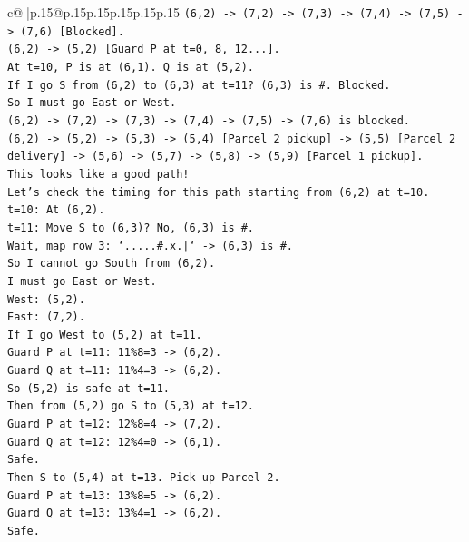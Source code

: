 \documentclass{article}
\begin{document}
{\begin{supertabular}{c@{$\;$}|p{.15\linewidth}@{}p{.15\linewidth}p{.15\linewidth}p{.15\linewidth}p{.15\linewidth}p{.15\linewidth}}
{{{\texttt{(6,2) {-}> (7,2) {-}> (7,3) {-}> (7,4) {-}> (7,5) {-}> (7,6) {[}Blocked{]}.} \\
\texttt{(6,2) {-}> (5,2) {[}Guard P at t=0, 8, 12...{]}.} \\
\texttt{At t=10, P is at (6,1). Q is at (5,2).} \\
\texttt{If I go S from (6,2) to (6,3) at t=11? (6,3) is \#. Blocked.} \\
\texttt{So I must go East or West.} \\
\texttt{(6,2) {-}> (7,2) {-}> (7,3) {-}> (7,4) {-}> (7,5) {-}> (7,6) is blocked.} \\
\texttt{(6,2) {-}> (5,2) {-}> (5,3) {-}> (5,4) {[}Parcel 2 pickup{]} {-}> (5,5) {[}Parcel 2 delivery{]} {-}> (5,6) {-}> (5,7) {-}> (5,8) {-}> (5,9) {[}Parcel 1 pickup{]}.} \\
\texttt{This looks like a good path!} \\
\texttt{Let's check the timing for this path starting from (6,2) at t=10.} \\
\texttt{t=10: At (6,2).} \\
\texttt{t=11: Move S to (6,3)? No, (6,3) is \#.} \\
\texttt{Wait, map row 3: `.....\#.x.|` {-}> (6,3) is \#.} \\
\texttt{So I cannot go South from (6,2).} \\
\texttt{I must go East or West.} \\
\texttt{West: (5,2).} \\
\texttt{East: (7,2).} \\
\texttt{If I go West to (5,2) at t=11.} \\
\texttt{Guard P at t=11: 11\%8=3 {-}> (6,2).} \\
\texttt{Guard Q at t=11: 11\%4=3 {-}> (6,2).} \\
\texttt{So (5,2) is safe at t=11.} \\
\texttt{Then from (5,2) go S to (5,3) at t=12.} \\
\texttt{Guard P at t=12: 12\%8=4 {-}> (7,2).} \\
\texttt{Guard Q at t=12: 12\%4=0 {-}> (6,1).} \\
\texttt{Safe.} \\
\texttt{Then S to (5,4) at t=13. Pick up Parcel 2.} \\
\texttt{Guard P at t=13: 13\%8=5 {-}> (6,2).} \\
\texttt{Guard Q at t=13: 13\%4=1 {-}> (6,2).} \\
\texttt{Safe.} \\
}}}
\end{supertabular}}
\end{document}

